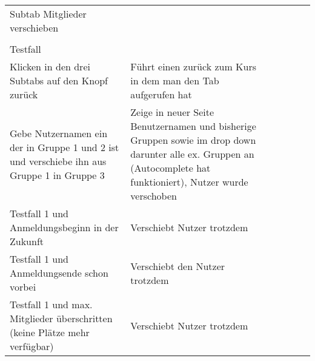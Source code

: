 \begin{table}[]
\begin{tabular}{p{6cm}p{7cm}p{3cm}llll}
	
		Subtab Mitglieder verschieben                                                                                                        &                                                                                                                                                                  &             &  &  &  \\
		&                                                                                                                                                                  &             &  &  &  \\
		Testfall                                                                                                                             &                                                                                                                                                                  &             &  &  &  \\
		Klicken in den drei Subtabs auf den Knopf zurück                                                                                     & Führt einen zurück zum Kurs in dem man den Tab aufgerufen hat                                                                                                    & \checkmark           &  &  &  \\
		Gebe Nutzernamen ein der in Gruppe 1 und 2 ist und verschiebe ihn aus Gruppe 1 in Gruppe 3                                           & Zeige in neuer Seite Benutzernamen und bisherige Gruppen sowie im drop down darunter alle ex. Gruppen an (Autocomplete hat funktioniert), Nutzer wurde verschoben & \checkmark           &  &  &  \\
		Testfall 1 und Anmeldungsbeginn in der Zukunft                                                                                       & Verschiebt Nutzer trotzdem                                                                                                                                       & \checkmark           &  &  &  \\
		Testfall 1 und Anmeldungsende schon vorbei                                                                                           & Verschiebt den Nutzer trotzdem                                                                                                                                   & \checkmark           &  &  &  \\
		Testfall 1 und max. Mitglieder überschritten (keine Plätze mehr verfügbar)                                                           & Verschiebt Nutzer trotzdem                                                                                                                                       & \checkmark           &  &  &  \\

\end{tabular}
\end{table}
